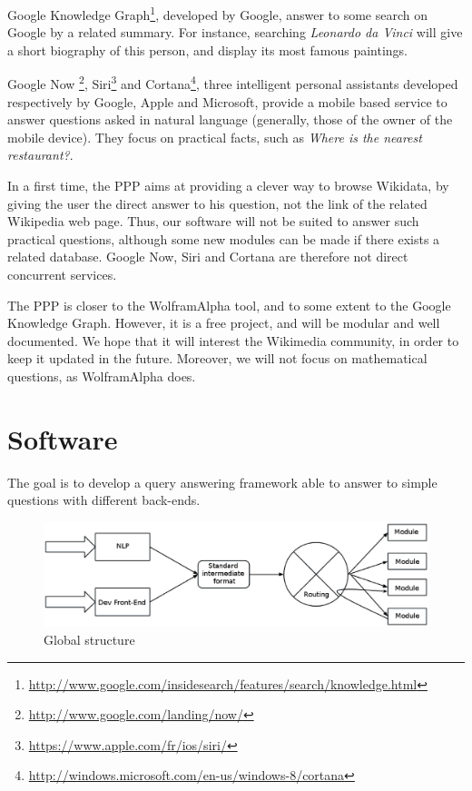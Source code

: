 \documentclass[a4paper,10pt]{article}
\begin{document}
Google Knowledge Graph\footnote{\url{http://www.google.com/insidesearch/features/search/knowledge.html}}, developed by Google, answer to some search on Google by a 
related summary. For instance, searching \emph{Leonardo da Vinci} will give a short
biography of this person, and display its most famous paintings.

Google Now \footnote{\url{http://www.google.com/landing/now/}}, Siri\footnote{
\url{https://www.apple.com/fr/ios/siri/}} and Cortana\footnote{\url{http://windows.microsoft.com/en-us/windows-8/cortana}}, three intelligent personal 
assistants developed respectively by Google, Apple and Microsoft, provide a mobile 
based service to answer questions asked in natural language (generally, those of 
the owner of the mobile device). They focus on practical facts, such as \emph{Where 
is the nearest restaurant?}.

In a first time, the PPP aims at providing a clever way to browse Wikidata, by giving the 
user the direct answer to his question, not the link of the related Wikipedia
web page. Thus, our software will not be suited to answer such practical questions,
although some new modules can be made if there exists a related database. Google Now, Siri
and Cortana are therefore not direct concurrent services.

The PPP is closer to the WolframAlpha tool, and to some extent to the Google Knowledge 
Graph. However, it is a free project,
and will be modular and well documented. We hope that it will interest the 
Wikimedia community, in order to keep it updated in the future. Moreover,
we will not focus on mathematical questions, as WolframAlpha does.

\section{Software}

The goal is to develop a query answering framework able to answer to simple questions with different back-ends. 

\begin{figure}[!ht]
    \centering
    \includegraphics[scale=0.40]{images/Structure-PPP-en.eps}
    \caption{Global structure}
\end{figure}
\end{document}

